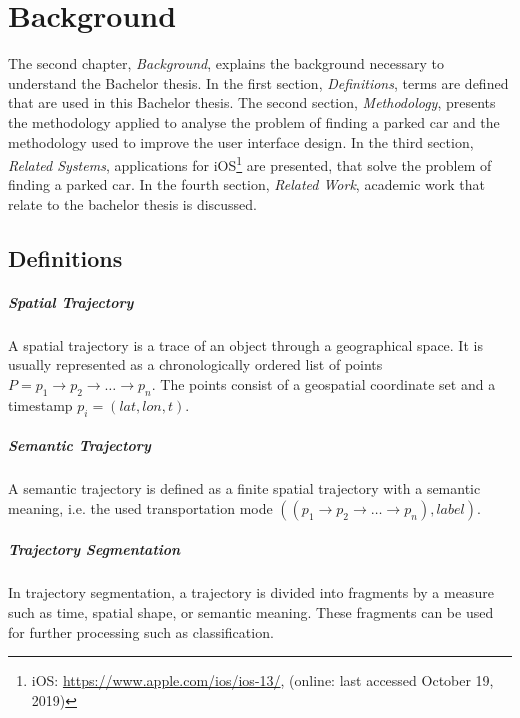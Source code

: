 \chapter{Background}
The second chapter, \textit{Background}, explains the background necessary to understand the Bachelor thesis. 
In the first section, \textit{Definitions}, terms are defined that are used in this Bachelor thesis.
The second section, \textit{Methodology}, presents the methodology applied to analyse the problem of finding a parked car and the methodology used to improve the user interface design.
In the third section, \textit{Related Systems}, applications for iOS\footnote{iOS: \url{https://www.apple.com/ios/ios-13/}, (online: last accessed October 19, 2019)} are presented, that solve the problem of finding a parked car.
In the fourth section, \textit{Related Work}, academic work that relate to the bachelor thesis is discussed.

\section{Definitions}

\paragraph{Spatial Trajectory} A spatial trajectory is a trace of an object through a geographical space. It is usually represented as a chronologically ordered list of points $ P = p_1\rightarrow p_2 \rightarrow \dots \rightarrow p_n$. The points consist of a geospatial coordinate set and a timestamp $p_i=(lat,lon,t)$. \cite{Zheng:2015:TDM:2764959.2743025}

\paragraph{Semantic Trajectory} A semantic trajectory is defined as a finite spatial trajectory with a semantic meaning, i.e. the used transportation mode $((p_1\rightarrow p_2 \rightarrow \dots \rightarrow p_n), label)$. \cite{Zheng:2015:TDM:2764959.2743025}

\paragraph{Trajectory Segmentation} In trajectory segmentation, a trajectory is divided into fragments by a measure such as time, spatial shape, or semantic meaning. These fragments can be used for further processing such as classification. \cite{Zheng:2015:TDM:2764959.2743025}

